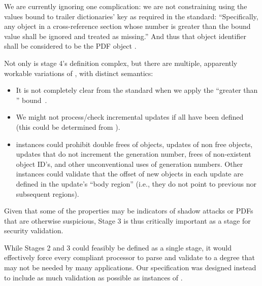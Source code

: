 We are currently ignoring one complication: we are not constraining \objids{} using the values bound to trailer dictionaries'  key as required in the standard:
``Specifically, any object in a cross-reference section whose number is
greater than the bound value shall be ignored and treated as missing.''
And thus that object identifier shall be considered to be the PDF object .

Not only is stage 4's definition complex, but there are multiple, apparently workable variations of , with distinct semantics:
\begin{itemize}
\item It is not completely clear from the standard when we apply the ``greater than '' bound~\cite{pdfIssue149}.
\item We might not process/check incremental updates if all \objids{} have been defined (this could be determined from ).
\item {} instances could prohibit double frees of objects, updates of non free objects, updates that do not increment the generation number, frees of non-existent object ID's, and other unconventional uses of generation numbers.
%
Other instances could validate that the offset of new objects in each update are defined in the update's ``body region'' (i.e., they do not point to previous nor subsequent regions).
\end{itemize}
%
Given that some of the properties may be indicators of shadow attacks or PDFs that are otherwise suspicious, Stage 3 is thus critically important as a stage for security validation.

While Stages 2 and 3 could feasibly be defined as a single stage, it would effectively force every compliant processor to parse and validate to a degree that may not be needed by many applications.
%
Our specification was designed instead to include as much validation as possible as instances of .


